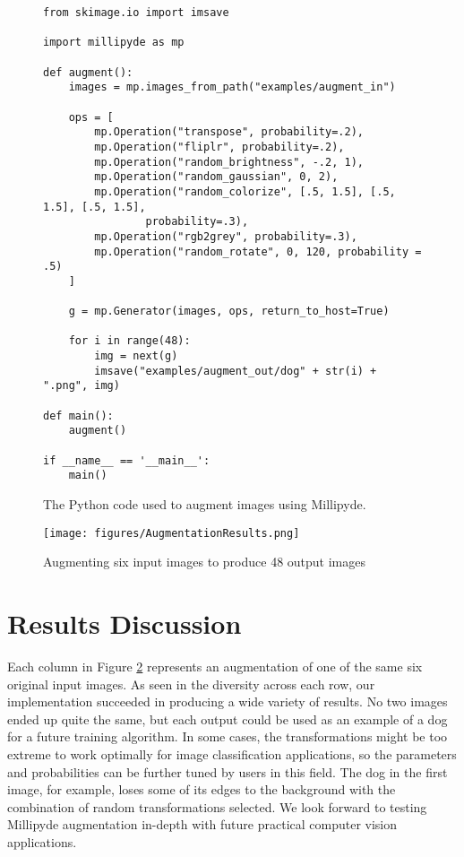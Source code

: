 \begin{figure}
\begin{lstlisting}
from skimage.io import imsave

import millipyde as mp

def augment():
    images = mp.images_from_path("examples/augment_in")

    ops = [
        mp.Operation("transpose", probability=.2),
        mp.Operation("fliplr", probability=.2),
        mp.Operation("random_brightness", -.2, 1),
        mp.Operation("random_gaussian", 0, 2),
        mp.Operation("random_colorize", [.5, 1.5], [.5, 1.5], [.5, 1.5], 
                probability=.3),
        mp.Operation("rgb2grey", probability=.3),
        mp.Operation("random_rotate", 0, 120, probability = .5)
    ]

    g = mp.Generator(images, ops, return_to_host=True)

    for i in range(48):
        img = next(g)
        imsave("examples/augment_out/dog" + str(i) + ".png", img)
    
def main():
    augment()

if __name__ == '__main__':
    main()
\end{lstlisting}
\caption{The Python code used to augment images using Millipyde.}
\label{augmentCode}
\end{figure}

\begin{figure}[hbtp]
\texttt{[image: figures/AugmentationResults.png]}
\centering
\caption{Augmenting six input images to produce 48 output images}
\label{augmentResults}
\end{figure}

\section{Results Discussion}

Each column in Figure \ref{augmentResults} represents an augmentation of one of the same six original input images. As seen in the diversity across each row, our implementation succeeded in producing a wide variety of results. No two images ended up quite the same, but each output could be used as an example of a dog for a future training algorithm. In some cases, the transformations might be too extreme to work optimally for image classification applications, so the parameters and probabilities can be further tuned by users in this field. The dog in the first image, for example, loses some of its edges to the background with the combination of random transformations selected. We look forward to testing Millipyde augmentation in-depth with future practical computer vision applications.